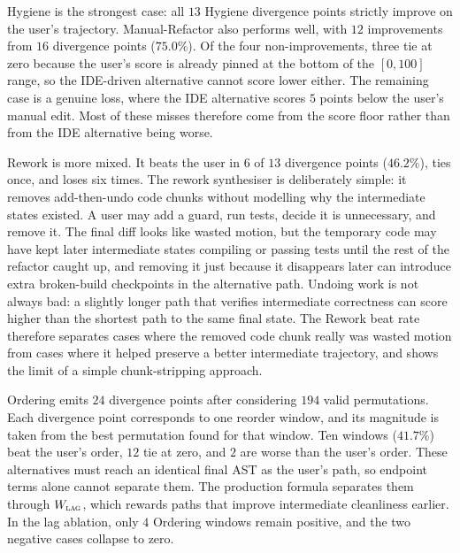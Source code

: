 Hygiene is the strongest case: all $13$ Hygiene divergence points strictly improve on the user's trajectory. Manual-Refactor also performs well, with $12$ improvements from $16$ divergence points ($75.0\%$). Of the four non-improvements, three tie at zero because the user's score is already pinned at the bottom of the $[0,100]$ range, so the IDE-driven alternative cannot score lower either. The remaining case is a genuine loss, where the IDE alternative scores $5$ points below the user's manual edit. Most of these misses therefore come from the score floor rather than from the IDE alternative being worse.

Rework is more mixed. It beats the user in $6$ of $13$ divergence points ($46.2\%$), ties once, and loses six times. The rework synthesiser is deliberately simple: it removes add-then-undo code chunks without modelling why the intermediate states existed. A user may add a guard, run tests, decide it is unnecessary, and remove it. The final diff looks like wasted motion, but the temporary code may have kept later intermediate states compiling or passing tests until the rest of the refactor caught up, and removing it just because it disappears later can introduce extra broken-build checkpoints in the alternative path. Undoing work is not always bad: a slightly longer path that verifies intermediate correctness can score higher than the shortest path to the same final state. The Rework beat rate therefore separates cases where the removed code chunk really was wasted motion from cases where it helped preserve a better intermediate trajectory, and shows the limit of a simple chunk-stripping approach.

Ordering emits $24$ divergence points after considering $194$ valid permutations. Each divergence point corresponds to one reorder window, and its magnitude is taken from the best permutation found for that window. Ten windows ($41.7\%$) beat the user's order, $12$ tie at zero, and $2$ are worse than the user's order. These alternatives must reach an identical final AST as the user's path, so endpoint terms alone cannot separate them. The production formula separates them through $W_{\textsc{lag}}$, which rewards paths that improve intermediate cleanliness earlier. In the lag ablation, only $4$ Ordering windows remain positive, and the two negative cases collapse to zero.

